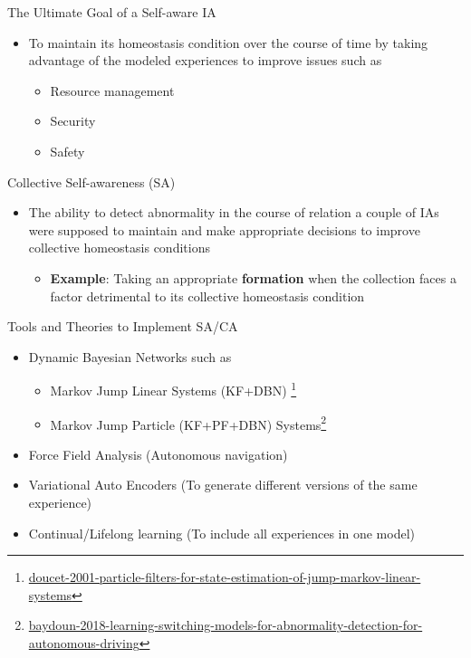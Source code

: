 \documentclass[unknownkeysallowed]{beamer}
\begin{document}
	\begin{frame}{The Ultimate Goal of a Self-aware IA}
		\begin{itemize}
			\item To maintain its homeostasis condition over the course of time by taking advantage of the modeled experiences to improve issues such as 
			\begin{itemize}
				\item Resource management
				\item Security
				\item Safety
			\end{itemize}
		\end{itemize}
	\end{frame}

	\begin{frame}{Collective Self-awareness (SA)}
		\begin{itemize}
			\item The ability to detect abnormality in the course of relation a couple of IAs were supposed to maintain and make appropriate decisions to improve collective homeostasis conditions
				\begin{itemize}
					\item \textbf{Example}: Taking an appropriate \textbf{formation} when the collection faces a factor detrimental to its collective homeostasis condition
				\end{itemize}
		\end{itemize}
	\end{frame}

	\begin{frame}{Tools and Theories to Implement SA/CA}
		\begin{itemize}
			\item Dynamic Bayesian Networks such as 
			\begin{itemize}
				\item Markov Jump Linear Systems (KF+DBN) \footnote{\url{doucet-2001-particle-filters-for-state-estimation-of-jump-markov-linear-systems}}
				\item Markov Jump Particle (KF+PF+DBN) Systems\footnote{\url{baydoun-2018-learning-switching-models-for-abnormality-detection-for-autonomous-driving}}
			\end{itemize}
			\item Force Field Analysis (Autonomous navigation)
			\item Variational Auto Encoders (To generate different versions of the same experience)
			\item Continual/Lifelong learning (To include all experiences in one model)
		\end{itemize}
	\end{frame}
\end{document}
